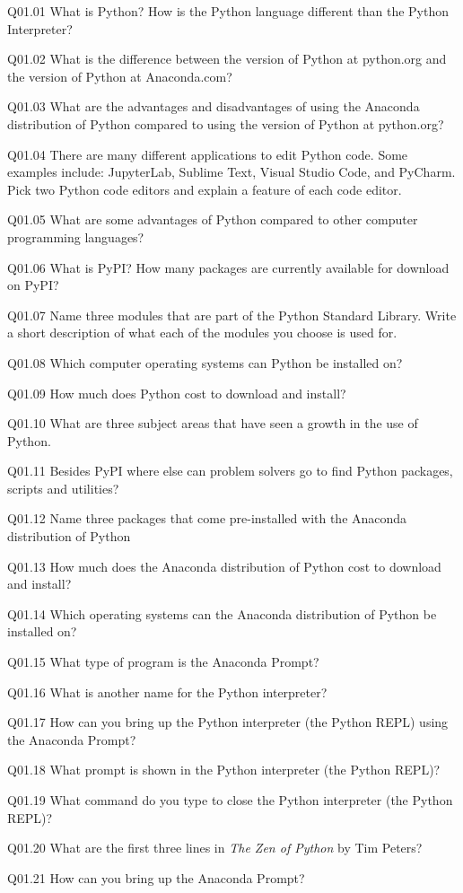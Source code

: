 \documentclass{book}
\newenvironment{problems}{}{}  %
\begin{document}
    
        \begin{problems}
        Q01.01 What is Python? How is the Python language different than the
Python Interpreter?

Q01.02 What is the difference between the version of Python at
python.org and the version of Python at Anaconda.com?

Q01.03 What are the advantages and disadvantages of using the Anaconda
distribution of Python compared to using the version of Python at
python.org?

Q01.04 There are many different applications to edit Python code. Some
examples include: JupyterLab, Sublime Text, Visual Studio Code, and
PyCharm. Pick two Python code editors and explain a feature of each code
editor.

Q01.05 What are some advantages of Python compared to other computer
programming languages?

Q01.06 What is PyPI? How many packages are currently available for
download on PyPI?

Q01.07 Name three modules that are part of the Python Standard Library.
Write a short description of what each of the modules you choose is used
for.

Q01.08 Which computer operating systems can Python be installed on?

Q01.09 How much does Python cost to download and install?

Q01.10 What are three subject areas that have seen a growth in the use
of Python.

Q01.11 Besides PyPI where else can problem solvers go to find Python
packages, scripts and utilities?

Q01.12 Name three packages that come pre-installed with the Anaconda
distribution of Python

Q01.13 How much does the Anaconda distribution of Python cost to
download and install?

Q01.14 Which operating systems can the Anaconda distribution of Python
be installed on?

Q01.15 What type of program is the Anaconda Prompt?

Q01.16 What is another name for the Python interpreter?

Q01.17 How can you bring up the Python interpreter (the Python REPL)
using the Anaconda Prompt?

Q01.18 What prompt is shown in the Python interpreter (the Python REPL)?

Q01.19 What command do you type to close the Python interpreter (the
Python REPL)?

Q01.20 What are the first three lines in \emph{The Zen of Python} by Tim
Peters?

Q01.21 How can you bring up the Anaconda Prompt?
        \end{problems}
\end{document}
